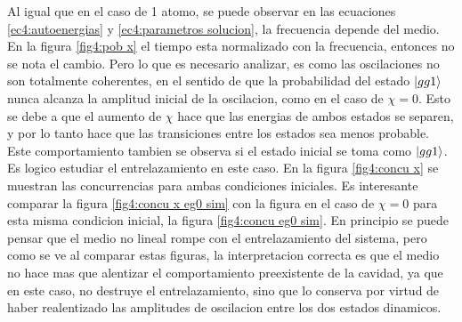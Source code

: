 Al igual que en el caso de 1 atomo, se puede observar en las ecuaciones \ref{ec4:autoenergias} y \ref{ec4:parametros solucion}, la frecuencia depende del medio. En la figura \ref{fig4:pob x} el tiempo esta normalizado con la frecuencia, entonces no se nota el cambio. Pero lo que es necesario analizar, es como las oscilaciones no son totalmente coherentes, en el sentido de que la probabilidad del estado $\ket{gg1}$ nunca alcanza la amplitud inicial de la oscilacion, como en el caso de $\chi=0$. Esto se debe a que el aumento de $\chi$ hace que las energias de ambos estados se separen, y por lo tanto hace que las transiciones entre los estados sea menos probable. Este comportamiento tambien se observa si el estado inicial se toma como $\ket{gg1}$. Es logico estudiar el entrelazamiento en este caso. En la figura \ref{fig4:concu x} se muestran las concurrencias para ambas condiciones iniciales. Es interesante comparar la figura \ref{fig4:concu x eg0 sim} con la figura en el caso de $\chi=0$ para esta misma condicion inicial, la figura \ref{fig4:concu eg0 sim}. En principio se puede pensar que el medio no lineal rompe con el entrelazamiento del sistema, pero como se ve al comparar estas figuras, la interpretacion correcta es que el medio no hace mas que alentizar el comportamiento preexistente de la cavidad, ya que en este caso, no destruye el entrelazamiento, sino que lo conserva por virtud de haber realentizado las amplitudes de oscilacion entre los dos estados dinamicos.
